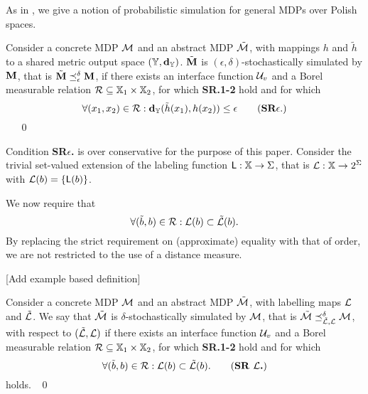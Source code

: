 \documentclass{ifacconf}
\newcommand{\red}[1]{{\color{red} #1}}
\begin{document}
As in \citep{haesaert2017verification},  we give a notion of probabilistic simulation for  general MDPs over Polish spaces.
%
\begin{definition}\label{def:apbsim}
Consider a concrete MDP $\mathcal{M}$ and an abstract  MDP $\tilde{\mathcal{M}}$, with mappings $h$ and  $\tilde h$  to a shared {metric} output space  $({\mathbb{Y}},\mathbf{d}_{\mathbb{Y}})$.   
	$\tilde{{\mathbf{M}}}$ is $(\epsilon,\delta)$-stochastically simulated by ${\mathbf{M}}$, that is $\tilde{{\mathbf{M}}}\preceq^{\delta}_\epsilon{\mathbf{M}}$,  if there exists an interface function $\mathcal{U}_{v}$ and
	a Borel measurable relation $\mathcal{R}\subseteq {\mathbb{X}}_1\times {\mathbb{X}}_2$, for which \textbf{SR.1-2} hold and for which 
	\begin{equation}
		\forall (x_1,x_2)\in \rel:\mathbf{d}_\Y(\tilde h(x_1),h(x_2))  \leq \epsilon\tag{\textbf{SR$\epsilon$}.}
	\end{equation} 
\mbox{ }	\hfill\mbox{ }\qed
\end{definition}
Condition \textbf{SR$\epsilon$.} is over conservative for the purpose of this paper. 
Consider the trivial set-valued extension of  the labeling function $\mathsf{L}:{\mathbb{X}}\rightarrow\Sigma$, that is  $\mathcal{L}:{\mathbb{X}}\rightarrow2^\Sigma$ with
 $\mathcal{L}(b)=\{\mathsf{L}(b)\}$.
 
We now require that \begin{equation}
  \forall (\tilde b,b)\in \mathcal{R}:  \mathcal{L}(b)\subset \tilde{\mathcal{L}}(b).
  \end{equation} 
By replacing the strict requirement on (approximate) equality with that of order,   we are not restricted to the use of a distance measure. %

\red{[Add example based definition]}
 
 

\begin{definition}\label{def:apbsim}
Consider a concrete MDP $\mathcal{M}$ and an abstract  MDP $\tilde{\mathcal{M}}$, with labelling maps $\mathcal{L}$ and  $\tilde{\mathcal{L}}$.   
We say that	$\tilde{\mathcal{M}}$ is $\delta$-stochastically simulated by $\mathcal{M}$, that is $\tilde{\mathcal{M}}\preceq^{\delta}_{\tilde{\mathcal{L}},\mathcal{L}}\mathcal{M}$, with respect to $(\tilde{\mathcal{L}},\mathcal{L})$  if there exists an interface function $\mathcal{U}_{v}$ and
	a Borel measurable relation $\mathcal{R}\subseteq {\mathbb{X}}_1\times {\mathbb{X}}_2$, for which \textbf{SR.1-2} hold and for which 	\begin{equation}
	  \forall (\tilde b,b)\in \rel:  \Labset(b)\subset \tilde{\Labset}(b).
\tag{\textbf{SR~$\CA L$.}}
	\end{equation} 
holds. \hfill\mbox{ }\qed
\end{definition}
\end{document}
